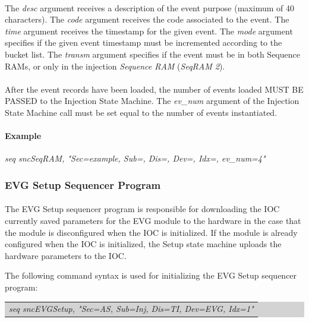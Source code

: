 \documentclass[openany]{article}
\begin{document}
			\paragraph{} The \emph{desc} argument receives a description of the event purpose (maximum of 40 characters). The \emph{code} argument receives the code associated to the event. The \emph{time} argument receives the timestamp for the given event. The \emph{mode} argument specifies if the given event timestamp must be incremented according to the bucket list. The \emph{transm} argument specifies if the event must be in both Sequence RAMs, or only in the injection \emph{Sequence RAM} (\emph{SeqRAM 2}).
			\paragraph{} After the event records have been loaded, the number of events loaded MUST BE PASSED to the Injection State Machine. The \emph{ev\_num} argument of the Injection State Machine call must be set equal to the number of events instantiated.
			\paragraph{Example} \emph{seq sncSeqRAM, "Sec=example, Sub=, Dis=, Dev=, Idx=, ev\_num=4"}

		\subsubsection{EVG Setup Sequencer Program}

			\paragraph{} The EVG Setup sequencer program is responsible for downloading the IOC currently saved parameters for the EVG module to the hardware in the case that the module is disconfigured when the IOC is initialized. If the module is already configured when the IOC is initialized, the Setup state machine uploads the hardware parameters to the IOC.
			\par The following command syntax is used for initializing the EVG Setup sequencer program:

			\bigskip
			\colorbox{lightgray}{
				\begin{tabularx}{0.9\textwidth}{X}
				\emph{seq sncEVGSetup, "Sec=AS, Sub=Inj, Dis=TI, Dev=EVG, Idx=1"}
				\end{tabularx}
			}
\end{document}
